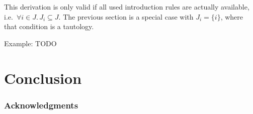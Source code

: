 \documentclass{llncs}
\begin{document}
This derivation is only valid if all used introduction rules are actually available, i.e.\ $\forall i \in J.\, J_i \subseteq J$.  The previous section is a special case with $J_i=\{i\}$, where that  condition is a tautology.


Example: TODO


\section{Conclusion}

\subsubsection*{Acknowledgments}



\end{document}
